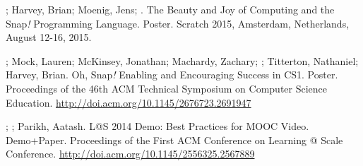 \begin{etaremune}
    \item{\dan; Harvey, Brian; Moenig, Jens; \me. The Beauty and Joy of Computing and the Snap\textit{!} Programming Language. Poster. Scratch 2015, Amsterdam, Netherlands, August 12-16, 2015.}

    \item{\me; Mock, Lauren; McKinsey, Jonathan; Machardy, Zachary; \dan; Titterton, Nathaniel; Harvey, Brian. Oh, Snap\textit{!} Enabling and Encouraging Success in CS1. Poster. Proceedings of the 46th ACM Technical Symposium on Computer Science Education.} \newline\href{http://doi.acm.org/10.1145/2676723.2691947}{http://doi.acm.org/10.1145/2676723.2691947}
    

    \item{\dan; \me; Parikh, Aatash. L@S 2014 Demo: Best Practices for MOOC Video. Demo+Paper. Proceedings of the First ACM Conference on Learning @ Scale Conference.} \href{http://doi.acm.org/10.1145/2556325.2567889}{http://doi.acm.org/10.1145/2556325.2567889}

\end{etaremune}
